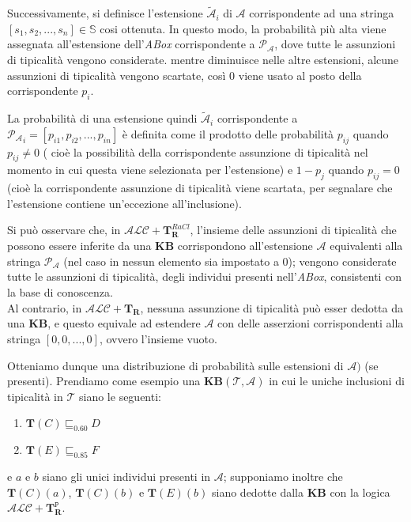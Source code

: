 Successivamente, si definisce l’estensione $ \mathcal{\widetilde{A}}_i $ di $ \mathcal{{A}} $ 
corrispondente ad una stringa $ [s_1,s_2,...,s_n] \in \mathbb{S} $ cosi ottenuta. 
In questo modo, la probabilità più alta viene assegnata all'estensione dell'\textit{ABox} corrispondente a 
$ \mathcal{P_{A}} $, dove tutte le assunzioni di tipicalità vengono considerate.
mentre diminuisce nelle altre estensioni, alcune assunzioni di tipicalità vengono scartate, 
così 0 viene usato al posto della corrispondente $ p_i $.

La probabilità di una estensione quindi $ \mathcal{\widetilde{A}}_i $ corrispondente a 
$ \mathcal{P_{A}}_i  = [p_{i1},p_{i2}, . . . ,p_{in}] $ è definita come il prodotto delle probabilità 
$ p_{ij} $ quando $ p_{ij} \neq 0 $ ( cioè la possibilità della corrispondente assunzione di 
tipicalità nel momento in cui questa viene selezionata per l’estensione) e $ 1 - p_j $ quando $ p_{ij} = 0 $ (cioè la corrispondente assunzione di tipicalità viene scartata, per segnalare che 
l’estensione contiene un’eccezione all'inclusione).

Si può osservare che, in $ \mathcal{ALC} + \mathbf{T}_{\mathbf{R}}^{\mathit{RaCl}} $, 
l’insieme delle assunzioni di tipicalità che
possono essere inferite da una \textbf{KB} corrispondono all'estensione $ \mathcal{A} $ equivalenti alla
stringa $ \mathcal{P_{A}} $ (nel caso in nessun elemento sia impostato a 0);
vengono considerate tutte le assunzioni di tipicalità,
degli individui presenti nell’\textit{ABox}, consistenti con la base di conoscenza.\\
Al contrario, in $ \mathcal{ALC} + \mathbf{T}_{\mathbf{R}} $, nessuna assunzione di tipicalità può esser dedotta
da una \textbf{KB}, e questo equivale ad estendere $ \mathcal{A} $ con delle asserzioni corrispondenti alla
stringa $ [0, 0, . . . , 0] $, ovvero l'insieme vuoto.

Otteniamo dunque una distribuzione di probabilità sulle estensioni di $ \mathcal{A})$ (se presenti).
Prendiamo come esempio una $ \textbf{KB} (\mathcal{T} , \mathcal{A}) $ in cui le uniche 
inclusioni di tipicalità in $ \mathcal{T} $ siano le seguenti:
\begin{enumerate}
	\item $ \mathbf{T}(C) \sqsubseteq_{0.60} D $
	\item $ \mathbf{T}(E) \sqsubseteq_{0.85} F $
\end{enumerate}
e $ a $ e $ b $ siano gli unici individui presenti in $ \mathcal{A} $; supponiamo inoltre che $ \mathbf{T}(C)(a) $, 
$ \mathbf{T}(C)(b) $ e $ \mathbf{T}(E)(b) $ siano dedotte dalla \textbf{KB} con la logica 
$ \mathcal{ALC} + \mathbf{T}_{\mathbf{R}}^{\mathtt{P}} $.

